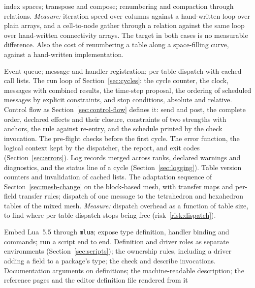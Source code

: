 \documentclass[11pt,a4paper]{article}
\newcommand{\code}[1]{\texttt{#1}}
\begin{document}
\begin{description}[style=nextline,leftmargin=2em]
        index spaces; transpose and compose; renumbering and compaction
        through relations.
        \emph{Measure:} iteration speed over columns against a hand-written
        loop over plain arrays, and a cell-to-node gather through a relation
        against the same loop over hand-written connectivity arrays.  The
        target in both cases is no measurable difference.  Also the cost of
        renumbering a table along a space-filling curve, against a
        hand-written implementation.
  \item[M2. Events and dispatch.]
        Event queue; message and handler registration; per-table dispatch
        with cached call lists.  The run loop of Section~\ref{sec:cycles}:
        the cycle counter, the clock, messages with combined results, the
        time-step proposal, the ordering of scheduled messages by explicit
        constraints, and stop conditions, absolute and relative.  Control
        flow as Section~\ref{sec:control-flow} defines it: send and post,
        the complete order, declared effects and their closure, constraints
        of two strengths with anchors, the rule against re-entry, and the
        schedule printed by the check invocation.
        The pre-flight checks before the first cycle.  The error function,
        the logical context kept by the dispatcher, the report, and exit
        codes (Section~\ref{sec:errors}).  Log records merged across ranks,
        declared warnings and diagnostics, and the status line of a cycle
        (Section~\ref{sec:logging}).  Table version counters and invalidation of
        cached lists.  The adaptation sequence of
        Section~\ref{sec:mesh-change} on the block-based mesh, with transfer
        maps and per-field transfer rules; dispatch of one message to the
        tetrahedron and hexahedron tables of the mixed mesh.
        \emph{Measure:} dispatch overhead as a function of table size, to find
        where per-table dispatch stops being free (risk~\ref{risk:dispatch}).
  \item[M3. Lua front end.]
        Embed Lua~5.5 through \code{mlua}; expose type definition, handler
        binding and commands; run a script end to end.  Definition and driver
        roles as separate environments (Section~\ref{sec:scripts}); the
        ownership rules, including a driver adding a field to a package's
        type; the check and describe invocations.  Documentation
        arguments on definitions; the machine-readable description; the
        reference pages and the editor definition file rendered from it

\end{description}
\end{document}
